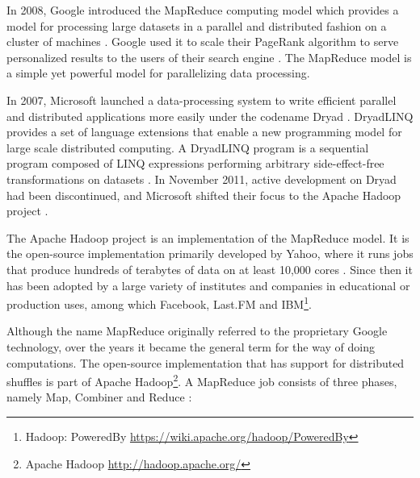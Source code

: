 In 2008, Google introduced the MapReduce computing model which provides a model for processing large datasets in a parallel and distributed fashion on a cluster of machines \cite{Dean:2008:MSD:1327452.1327492}. Google used it to scale their PageRank algorithm to serve personalized results to the users of their search engine \cite{Bahmani:2011:FPP:1989323.1989425}. The MapReduce model is a simple yet powerful model for parallelizing data processing. 

In 2007, Microsoft launched a data-processing system to write efficient parallel and distributed applications more easily under the codename Dryad \cite{export:63785}. DryadLINQ provides a set of language extensions that enable a new programming model for large scale distributed computing. A DryadLINQ program is a sequential program composed of LINQ expressions performing arbitrary side-effect-free transformations on datasets \cite{export:70861}. In November 2011, active development on Dryad had been discontinued, and Microsoft shifted their focus to the Apache Hadoop project \cite{linqdisc}.

The Apache Hadoop project is an implementation of the MapReduce model. It is the open-source implementation primarily developed by Yahoo, where it runs jobs that produce hundreds of terabytes of data on at least 10,000 cores \cite{HadoopMapYahoo}. Since then it has been adopted by a large variety of institutes and companies in educational or production uses, among which Facebook, Last.FM and IBM\footnote{Hadoop: PoweredBy \url{https://wiki.apache.org/hadoop/PoweredBy}}.

Although the name MapReduce originally referred to the proprietary Google technology, over the years it became the general term for the way of doing computations. The open-source implementation that has support for distributed shuffles is part of Apache Hadoop\footnote{Apache Hadoop \url{http://hadoop.apache.org/}}. A MapReduce job consists of three phases, namely Map, Combiner and Reduce \cite{Dean:2008:MSD:1327452.1327492}:

